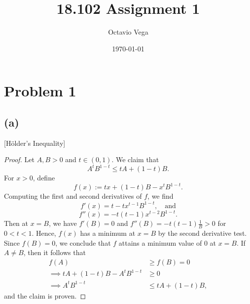 \documentclass{article}
\title{18.102 Assignment 1}
\author{Octavio Vega}
\date\today
\begin{document}
\maketitle %

\section*{Problem 1}
\subsection*{(a)}
[Hölder's Inequality]
\begin{proof}
	Let $A,B>0$ and $t\in(0,1)$. We claim that 
	\begin{equation}\label{hint}
		A^tB^{1-t}\leq tA + (1-t)B.
	\end{equation}
	For $x>0$, define $$f(x):= tx + (1-t)B -x^tB^{1-t}.$$
	Computing the first and second derivatives of $f$, we find $$f'(x)=t-tx^{t-1}B^{1-t},\quad \textrm{and}$$
	$$f''(x)=-t(t-1)x^{t-2}B^{1-t}.$$
	Then at $x=B$, we have $f'(B)=0$ and $f''(B)=-t(t-1)\frac{1}{B}>0$ for $0<t<1$. Hence, $f(x)$ has a minimum at $x=B$ by the second derivative test. Since $f(B)=0$, we conclude that $f$ attains a minimum value of 0 at $x=B$. If $A\neq B$, then it follows that
	\begin{align}
		f(A) &\geq f(B)=0\\
		 \implies tA + (1-t)B - A^tB^{1-t}&\geq 0\\
		 \implies A^tB^{1-t}&\leq tA + (1-t)B,
	\end{align}
	and the claim is proven. 
	

\end{proof}
\end{document}
